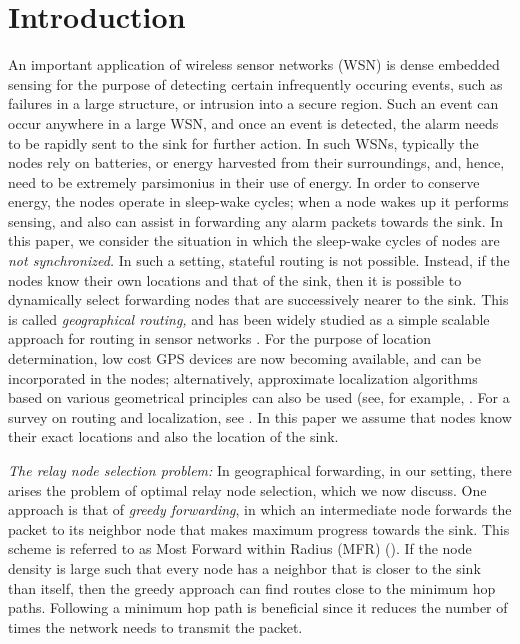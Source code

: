 \documentclass[onecolumn]{IEEEtran}
\begin{document}
\section{Introduction}
An important application of wireless sensor networks (WSN) is dense
embedded sensing for the purpose of detecting certain infrequently
occuring events, such as failures in a large structure, or intrusion
into a secure region. Such an event can occur anywhere in a large WSN,
and once an event is detected, the alarm needs to be rapidly sent to
the sink  for further action. In such WSNs, typically the
nodes rely on batteries, or energy harvested from their surroundings,
and, hence, need to be extremely parsimonius in their use of energy.
In order to conserve energy, the nodes operate in sleep-wake cycles;
when a node wakes up it performs sensing, and also can assist in
forwarding any alarm packets towards the sink. In this paper, we
consider the situation in which the sleep-wake cycles of nodes are
\emph{not synchronized.}  In such a setting, stateful routing is not
possible. 
Instead, if the nodes
know their own locations and that of the sink, then it is possible to
dynamically select forwarding nodes that are successively nearer to
the sink.  This is called \emph{geographical routing,} and has been
widely studied as a simple scalable approach for routing in sensor
networks \cite{takagi-kleinrock84optimaltransmission,hou-etal86rangecontrol,karp-etal00gpsr,kuhn-etal08algorithmicapproach}.
 For the purpose of location determination, low cost GPS
devices are now becoming available, and can be incorporated in the
nodes; alternatively, approximate localization algorithms based on
various geometrical principles can also be used (see, for example,
\cite{dulman-etal06hop-count,nath-kumar08distance-hop}. For a
survey on routing and localization, see
\cite{mauve-hartenstein01survey,Akkaya-younis05survey}. 
   In this paper we assume that nodes know their exact
locations and also the location of the sink.

\noindent
\emph{The relay node selection problem:} In geographical forwarding,
in our setting, there arises the problem of optimal relay node
selection, which we now discuss.  One approach is that of \emph{greedy
  forwarding}, in which an intermediate node forwards the packet to
its neighbor node that makes maximum progress towards the sink. This
scheme is referred to as Most Forward within Radius (MFR)
(\cite{takagi-kleinrock84optimaltransmission,hou-etal86rangecontrol}).
If the node density is large such that every node has a neighbor that
is closer to the sink than itself, then the greedy approach can find
routes close to the minimum hop paths. Following a minimum hop path is
beneficial since it reduces the number of times the network needs to
transmit the packet.
\end{document}
